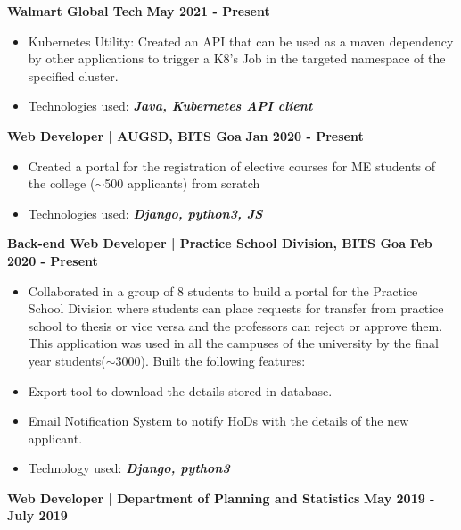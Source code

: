 \documentclass[10pt]{article}
\begin{document}
\spacedhrule{0.15ex}{1.0ex}

\large {\textbf{Walmart Global Tech}} \normalsize
{\hfill} \textbf{May 2021 - Present}\\[-1.9em]
\begin{itemize}
    \item Kubernetes Utility: Created an API that can be used as a maven dependency by other applications to trigger a K8's Job in the targeted namespace of the specified cluster.\\ [-1.9em]
    \item Technologies used: \textit{\textbf{Java, Kubernetes API client}}\\[-1.25em]
\end{itemize}
\large {\textbf{Web Developer | AUGSD, BITS Goa}} \normalsize
\href{https://github.com/vezcraz/ME-Elective-open-} {\hspace{0.5ex}\faMousePointer}
{\hfill} \textbf{Jan 2020 - Present}\\[-1.9em]
\begin{itemize}
    \item Created a portal for the registration of elective courses for ME students of the college ($\sim$500 applicants) from scratch \\ [-1.9em]
    \item Technologies used: \textit{\textbf{Django, python3, JS}}\\[-1.25em]
\end{itemize}
\large { \textbf{Back-end Web Developer | Practice School Division, BITS Goa}} \normalsize
{\hfill} \textbf{Feb 2020 - Present}\\[-1.9em]

\begin{itemize}[leftmargin=0.3em]
    \item[] Collaborated in a group of 8 students to build a portal for the Practice School Division where students can place requests for transfer from practice school to thesis or vice versa and the professors can reject or approve them. This application was used in all the campuses of the university by the final year students($\sim$3000). Built the following features: \\ [-2em]
\end{itemize}


\begin{itemize}
    \item Export tool to download the details stored in database.\\[-1.9em]
    \item Email Notification System to notify HoDs with the details of the new applicant.\\[-1.9em]
    \item Technology used: \textit{\textbf{Django, python3}}\\[-1.25em]
\end{itemize}
\large { \textbf{Web Developer | Department of Planning and Statistics }} \normalsize
\href{https://github.com/vezcraz/PS1-Dopspi} {\hspace{0.5ex}\faMousePointer}
{\hfill} \textbf{May 2019 - July 2019}\\[-1.9em]
\end{document}
